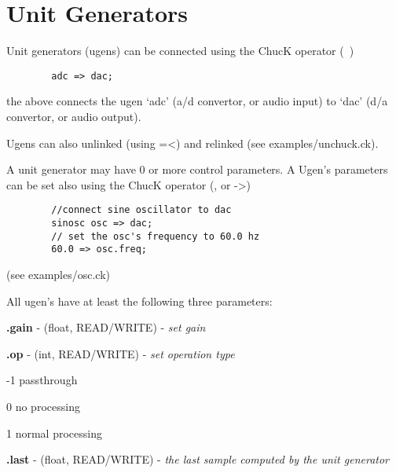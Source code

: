 \chapter{Unit Generators}

Unit generators (ugens) can be connected using the ChucK operator (~\chuckop)

\example
\begin{verbatim}
        adc => dac;
\end{verbatim}

the above connects the ugen `adc' (a/d convertor, or audio input) to `dac'  
(d/a convertor, or audio output).

Ugens can also unlinked (using =\textless) and relinked (see examples/unchuck.ck). 

A unit generator may have 0 or more control parameters.  
A Ugen's parameters can be set also using the ChucK operator (\chuckop, or -\textgreater) 

\example

\begin{verbatim}
        //connect sine oscillator to dac
        sinosc osc => dac;
        // set the osc's frequency to 60.0 hz
        60.0 => osc.freq;
\end{verbatim}
  (see examples/osc.ck)

\newpage

All ugen's have at least the following three parameters:

\control
\begin{chuckitemize}
\item {\bf .gain} - (float, READ/WRITE) - {\it set gain} 
\item {\bf .op} - (int, READ/WRITE) - {\it set operation type }
  \begin{chuckitemize}
    \item -1 passthrough 
    \item 0 no processing 
    \item 1 normal processing
  \end{chuckitemize}
\item {\bf .last} - (float, READ/WRITE) - {\it the last sample computed by the unit generator}
\end{chuckitemize}


\newpage


